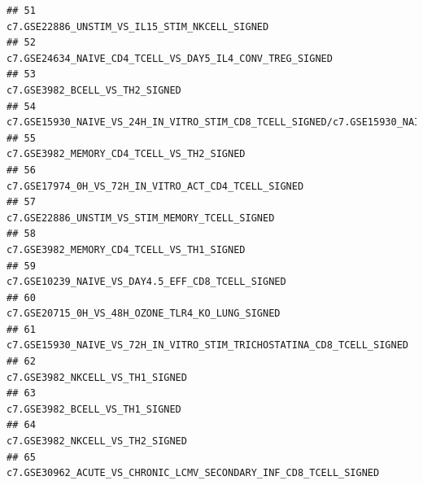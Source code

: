 \documentclass{article}\usepackage[]{graphicx}\usepackage[]{color}
\makeatletter
\newenvironment{kframe}{%
 \def\at@end@of@kframe{}%
 \ifinner\ifhmode%
  \def\at@end@of@kframe{\end{minipage}}%
  \begin{minipage}{\columnwidth}%
 \fi\fi%
 \def\FrameCommand##1{\hskip\@totalleftmargin \hskip-\fboxsep
 \colorbox{shadecolor}{##1}\hskip-\fboxsep
     \hskip-\linewidth \hskip-\@totalleftmargin \hskip\columnwidth}%
 \MakeFramed {\advance\hsize-\width
   \@totalleftmargin\z@ \linewidth\hsize
   \@setminipage}}%
 {\par\unskip\endMakeFramed%
 \at@end@of@kframe}
\newenvironment{knitrout}{}{} %
\makeatother
\begin{document}
\begin{knitrout}
\begin{kframe}
\begin{verbatim}
## 51                                                                                                                                      c7.GSE22886_UNSTIM_VS_IL15_STIM_NKCELL_SIGNED
## 52                                                                                                                           c7.GSE24634_NAIVE_CD4_TCELL_VS_DAY5_IL4_CONV_TREG_SIGNED
## 53                                                                                                                                                     c7.GSE3982_BCELL_VS_TH2_SIGNED
## 54 c7.GSE15930_NAIVE_VS_24H_IN_VITRO_STIM_CD8_TCELL_SIGNED/c7.GSE15930_NAIVE_VS_24H_IN_VITRO_STIM_IL12_CD8_TCELL_SIGNED/c7.GSE15930_NAIVE_VS_24H_IN_VITRO_STIM_INFAB_CD8_TCELL_SIGNED
## 55                                                                                                                                          c7.GSE3982_MEMORY_CD4_TCELL_VS_TH2_SIGNED
## 56                                                                                                                                c7.GSE17974_0H_VS_72H_IN_VITRO_ACT_CD4_TCELL_SIGNED
## 57                                                                                                                                     c7.GSE22886_UNSTIM_VS_STIM_MEMORY_TCELL_SIGNED
## 58                                                                                                                                          c7.GSE3982_MEMORY_CD4_TCELL_VS_TH1_SIGNED
## 59                                                                                                                                   c7.GSE10239_NAIVE_VS_DAY4.5_EFF_CD8_TCELL_SIGNED
## 60                                                                                                                                    c7.GSE20715_0H_VS_48H_OZONE_TLR4_KO_LUNG_SIGNED
## 61                                                                                                              c7.GSE15930_NAIVE_VS_72H_IN_VITRO_STIM_TRICHOSTATINA_CD8_TCELL_SIGNED
## 62                                                                                                                                                    c7.GSE3982_NKCELL_VS_TH1_SIGNED
## 63                                                                                                                                                     c7.GSE3982_BCELL_VS_TH1_SIGNED
## 64                                                                                                                                                    c7.GSE3982_NKCELL_VS_TH2_SIGNED
## 65                                                                                                                   c7.GSE30962_ACUTE_VS_CHRONIC_LCMV_SECONDARY_INF_CD8_TCELL_SIGNED

\end{verbatim}
\end{kframe}
\end{knitrout}
\end{document}
